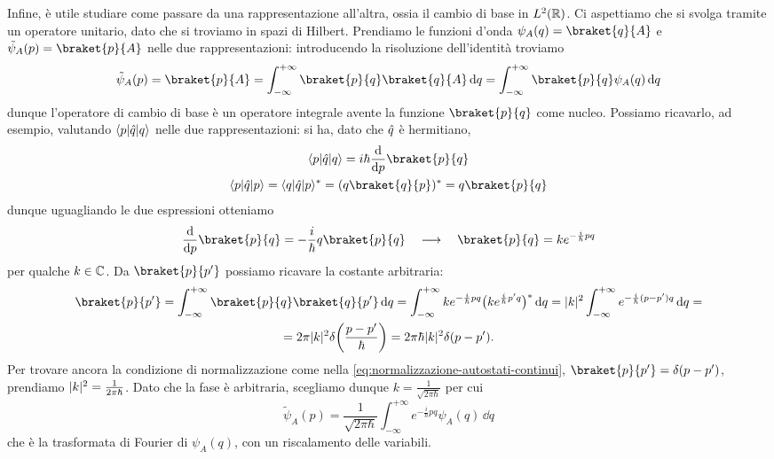 Infine, è utile studiare come passare da una rappresentazione all'altra, ossia il cambio di base in $\leb[2]{\R}$.
Ci aspettiamo che si svolga tramite un operatore unitario, dato che si troviamo in spazi di Hilbert.
Prendiamo le funzioni d'onda $\psi_A(q)=\braket{q}{A}$ e $\tilde{\psi}_A(p)=\braket{p}{A}$ nelle due rappresentazioni: introducendo la risoluzione dell'identità troviamo
\begin{equation}
	\tilde{\psi}_A(p)=\braket{p}{A}=\int_{-\infty}^{+\infty}\braket{p}{q}\braket{q}{A}\,\dd q=\int_{-\infty}^{+\infty}\braket{p}{q}\psi_A(q)\,\dd q
\end{equation}
dunque l'operatore di cambio di base è un operatore integrale avente la funzione $\braket{p}{q}$ come nucleo.
Possiamo ricavarlo, ad esempio, valutando $\bra{p}\op q\ket{q}$ nelle due rappresentazioni: si ha, dato che $\op q$ è hermitiano,
\begin{equation}
	\begin{gathered}
		\bra{p}\op q\ket{q}=i\hbar\drv{}{p}\braket{p}{q}\\
		\bra{p}\op q\ket{p}=\bra{q}\op q\ket{p}^*=(q\braket{q}{p})^*=q\braket{p}{q}
	\end{gathered}
\end{equation}
dunque uguagliando le due espressioni otteniamo
\begin{equation}
	\drv{}{p}\braket{p}{q}=-\frac{i}{\hbar}q\braket{p}{q}\qqq\braket{p}{q}=ke^{-\frac{i}{\hbar}pq}
	\label{eq:nucleo-operatore-cambio-base-pq}
\end{equation}
per qualche $k\in\C$.
Da $\braket{p}{p'}$ possiamo ricavare la costante arbitraria:
\begin{multline}
	\braket{p}{p'}=\int_{-\infty}^{+\infty}\braket{p}{q}\braket{q}{p'}\,\dd q=
	\int_{-\infty}^{+\infty}ke^{-\frac{i}{\hbar}pq}\big(ke^{\frac{i}{\hbar}p'q}\big)^*\,\dd q=
	\abs{k}^2\int_{-\infty}^{+\infty}e^{-\frac{i}{\hbar}(p-p')q}\,\dd q=\\=
	2\pi\abs{k}^2\delta\bigg(\frac{p-p'}{\hbar}\bigg)=
	2\pi\hbar\abs{k}^2\delta(p-p').
\end{multline}
Per trovare ancora la condizione di normalizzazione come nella \eqref{eq:normalizzazione-autostati-continui}, $\braket{p}{p'}=\delta(p-p')$, prendiamo $\abs{k}^2=\frac1{2\pi\hbar}$.
Dato che la fase è arbitraria, scegliamo dunque $k=\frac1{\sqrt{2\pi\hbar}}$ per cui
\begin{equation}
	\tilde{\psi}_A(p)=\frac1{\sqrt{2\pi\hbar}}\int_{-\infty}^{+\infty}e^{-\frac{i}{\hbar}pq}\psi_A(q)\,\dd q
	\label{eq:cambiamento-base-posizione-impulso}
\end{equation}
che è la trasformata di Fourier di $\psi_A(q)$, con un riscalamento delle variabili.


